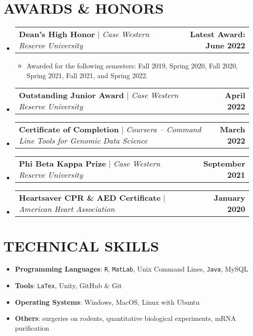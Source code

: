 \documentclass[letterpaper,11pt]{article}
\makeatletter
\newcommand{\resumeItem}[1]{
	\item\small{
		{#1 \vspace{0pt}}
	}
}
\newcommand{\resumeProjectHeading}[2]{
	\item
	\begin{tabular*}{1.001\textwidth}{l@{\extracolsep{\fill}}r}
		\small#1 & \textbf{\small #2}\\
	\end{tabular*}\vspace{-4pt}
}
\newcommand{\resumeSubHeadingListStart}{\begin{itemize}[leftmargin=0.0in, label={}]}
\newcommand{\resumeSubHeadingListEnd}{\end{itemize}}
\newcommand{\resumeItemListStart}{\begin{itemize}}
\newcommand{\resumeItemListEnd}{\end{itemize}\vspace{-5pt}}
\makeatother
\begin{document}
	\section{AWARDS \& HONORS}
	\vspace{-5pt}
	\resumeSubHeadingListStart
	
	\resumeProjectHeading
	{\textbf{Dean's High Honor} $|$ \emph{Case Western Reserve University}}{Latest Award: June 2022}
	\resumeItemListStart
	\resumeItem{Awarded for the following semesters: Fall 2019, Spring 2020, Fall 2020, Spring 2021, Fall 2021, and Spring 2022.}
	\resumeItemListEnd
	\vspace{-20pt}
	
	\resumeProjectHeading
	{\textbf{Outstanding Junior Award} $|$ \emph{Case Western Reserve University}}{April 2022}
	\vspace{-30pt}
	
	\resumeProjectHeading
	{\textbf{Certificate of Completion} $|$ \emph{Coursera -- Command Line Tools for Genomic Data Science}}{March 2022}
	\vspace{-30pt}
	
	\resumeProjectHeading
	{\textbf{Phi Beta Kappa Prize} $|$ \emph{Case Western Reserve University}}{September 2021}
	\vspace{-30pt}
	
	\resumeProjectHeading
	{\textbf{Heartsaver CPR \& AED Certificate} $|$ \emph{American Heart Association}}{January 2020}
	\resumeSubHeadingListEnd
	\vspace{-15pt}
	
	\section{TECHNICAL SKILLS}
		\begin{itemize}[itemsep=-2pt, parsep=5pt]
			\item \textbf{Programming Languages}: \texttt{R}, \texttt{MatLab}, Unix Command Lines, \texttt{Java}, MySQL
			\item \textbf{Tools}: \texttt{LaTex}, Unity, GitHub \& Git
			\item \textbf{Operating Systems}: Windows, MacOS, Linux with Ubuntu
			\item \textbf{Others}: surgeries on rodents, quantitative biological experiments, mRNA purification
		\end{itemize}
	\vspace*{2.0\multicolsep}

	
\end{document}
